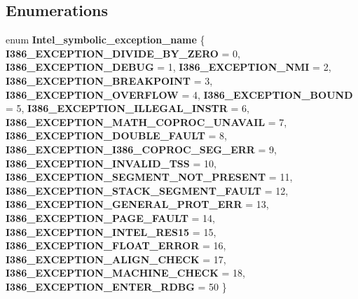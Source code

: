 \subsection*{Enumerations}
\begin{DoxyCompactItemize}
\item 
\mbox{\label{group__RTEMSScoreCPUi386_ga1b7d7ec8b0d361302cfc416d0295802c}} 
enum {\bfseries Intel\+\_\+symbolic\+\_\+exception\+\_\+name} \{ \newline
{\bfseries I386\+\_\+\+E\+X\+C\+E\+P\+T\+I\+O\+N\+\_\+\+D\+I\+V\+I\+D\+E\+\_\+\+B\+Y\+\_\+\+Z\+E\+RO} = 0, 
{\bfseries I386\+\_\+\+E\+X\+C\+E\+P\+T\+I\+O\+N\+\_\+\+D\+E\+B\+UG} = 1, 
{\bfseries I386\+\_\+\+E\+X\+C\+E\+P\+T\+I\+O\+N\+\_\+\+N\+MI} = 2, 
{\bfseries I386\+\_\+\+E\+X\+C\+E\+P\+T\+I\+O\+N\+\_\+\+B\+R\+E\+A\+K\+P\+O\+I\+NT} = 3, 
\newline
{\bfseries I386\+\_\+\+E\+X\+C\+E\+P\+T\+I\+O\+N\+\_\+\+O\+V\+E\+R\+F\+L\+OW} = 4, 
{\bfseries I386\+\_\+\+E\+X\+C\+E\+P\+T\+I\+O\+N\+\_\+\+B\+O\+U\+ND} = 5, 
{\bfseries I386\+\_\+\+E\+X\+C\+E\+P\+T\+I\+O\+N\+\_\+\+I\+L\+L\+E\+G\+A\+L\+\_\+\+I\+N\+S\+TR} = 6, 
{\bfseries I386\+\_\+\+E\+X\+C\+E\+P\+T\+I\+O\+N\+\_\+\+M\+A\+T\+H\+\_\+\+C\+O\+P\+R\+O\+C\+\_\+\+U\+N\+A\+V\+A\+IL} = 7, 
\newline
{\bfseries I386\+\_\+\+E\+X\+C\+E\+P\+T\+I\+O\+N\+\_\+\+D\+O\+U\+B\+L\+E\+\_\+\+F\+A\+U\+LT} = 8, 
{\bfseries I386\+\_\+\+E\+X\+C\+E\+P\+T\+I\+O\+N\+\_\+\+I386\+\_\+\+C\+O\+P\+R\+O\+C\+\_\+\+S\+E\+G\+\_\+\+E\+RR} = 9, 
{\bfseries I386\+\_\+\+E\+X\+C\+E\+P\+T\+I\+O\+N\+\_\+\+I\+N\+V\+A\+L\+I\+D\+\_\+\+T\+SS} = 10, 
{\bfseries I386\+\_\+\+E\+X\+C\+E\+P\+T\+I\+O\+N\+\_\+\+S\+E\+G\+M\+E\+N\+T\+\_\+\+N\+O\+T\+\_\+\+P\+R\+E\+S\+E\+NT} = 11, 
\newline
{\bfseries I386\+\_\+\+E\+X\+C\+E\+P\+T\+I\+O\+N\+\_\+\+S\+T\+A\+C\+K\+\_\+\+S\+E\+G\+M\+E\+N\+T\+\_\+\+F\+A\+U\+LT} = 12, 
{\bfseries I386\+\_\+\+E\+X\+C\+E\+P\+T\+I\+O\+N\+\_\+\+G\+E\+N\+E\+R\+A\+L\+\_\+\+P\+R\+O\+T\+\_\+\+E\+RR} = 13, 
{\bfseries I386\+\_\+\+E\+X\+C\+E\+P\+T\+I\+O\+N\+\_\+\+P\+A\+G\+E\+\_\+\+F\+A\+U\+LT} = 14, 
{\bfseries I386\+\_\+\+E\+X\+C\+E\+P\+T\+I\+O\+N\+\_\+\+I\+N\+T\+E\+L\+\_\+\+R\+E\+S15} = 15, 
\newline
{\bfseries I386\+\_\+\+E\+X\+C\+E\+P\+T\+I\+O\+N\+\_\+\+F\+L\+O\+A\+T\+\_\+\+E\+R\+R\+OR} = 16, 
{\bfseries I386\+\_\+\+E\+X\+C\+E\+P\+T\+I\+O\+N\+\_\+\+A\+L\+I\+G\+N\+\_\+\+C\+H\+E\+CK} = 17, 
{\bfseries I386\+\_\+\+E\+X\+C\+E\+P\+T\+I\+O\+N\+\_\+\+M\+A\+C\+H\+I\+N\+E\+\_\+\+C\+H\+E\+CK} = 18, 
{\bfseries I386\+\_\+\+E\+X\+C\+E\+P\+T\+I\+O\+N\+\_\+\+E\+N\+T\+E\+R\+\_\+\+R\+D\+BG} = 50
 \}
\end{DoxyCompactItemize}
